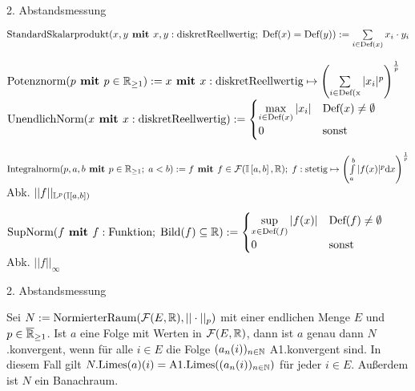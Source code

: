 \documentclass{article}
\begin{document}
\begin{flashcard}[Beispiele]{2. Abstandsmessung}


  \backside

  $\text{StandardSkalarprodukt}(x,y \textbf{ \textup{mit} \allowbreak} x,y : \text{diskretReellwertig}; \; \text{Def}(x) = \text{Def}(y)) := \sum \limits_{i \in \text{Def}(x)} x_{i} \cdot y_{i}$

  $\text{Potenznorm}(p \textbf{ \textup{mit} \allowbreak} p \in \mathbb{R}_{\geq 1}) := x \textbf{ \textup{mit} \allowbreak} x : \text{diskretReellwertig} \mapsto \left( \sum \limits_{i \in \text{Def(x}} |x_{i}|^{p} \right)^{\frac{1}{p}}$\\

  $\text{UnendlichNorm}(x \textbf{ \textup{mit} \allowbreak} x : \text{diskretReellwertig}) :=
  \begin{cases}
    \max \limits_{i \in \text{Def}(x)} |x_{i}| & \text{Def}(x) \neq \emptyset \\ 0 & \text{sonst}
  \end{cases}$

  $\text{Integralnorm}(p,a,b \textbf{ \textup{mit} \allowbreak} p \in \mathbb{R}_{\geq 1}; \; a < b) := f \textbf{ \textup{mit} \allowbreak} f \in \mathcal{F}(\mathbb{I} \left[a,b\right], \mathbb{R}); \; f: \text{stetig} \mapsto \left( \int \limits_{a}^{b} |f(x)|^{p} \text{d}x \right)^{\frac{1}{p}}$ Abk. $||f||_{\mathbb{L}^{p} (\mathbb{I} \left[ a,b \right])}$

  $\text{SupNorm}(f \textbf{ \textup{mit} \allowbreak} f : \text{Funktion}; \; \text{Bild}(f) \subseteq \mathbb{R}) :=
  \begin{cases}
    \sup \limits_{x \in \text{Def}(f)} |f(x)| & \text{Def}(f) \neq \emptyset \\
    0 & \text{sonst}
  \end{cases}$ Abk. $||f||_{\infty}$

\end{flashcard}


\begin{flashcard}[]{2. Abstandsmessung}





\backside


\begin{satz}

Sei $N := \text{NormierterRaum}(\mathcal{F} (E,\mathbb{R}), ||\cdot||_{p})$ mit einer endlichen Menge $E$ und $p \in \overline{\mathbb{R}}_{\geq 1}$. Ist $a$ eine Folge mit Werten in $\mathcal{F}(E,\mathbb{R})$, dann ist $a$ genau dann $N$.konvergent, wenn für alle $i \in E$ die Folge $(a_{n}(i))_{n \in \mathbb{N}}$ A1.konvergent sind. In diesem Fall gilt $N.\text{Limes}(a)(i) = \text{A1.Limes}((a_{n}(i))_{n \in \mathbb{N}})$ für jeder $i \in E$. Außerdem ist $N$ ein Banachraum.

\end{satz}

\end{flashcard}
\end{document}
